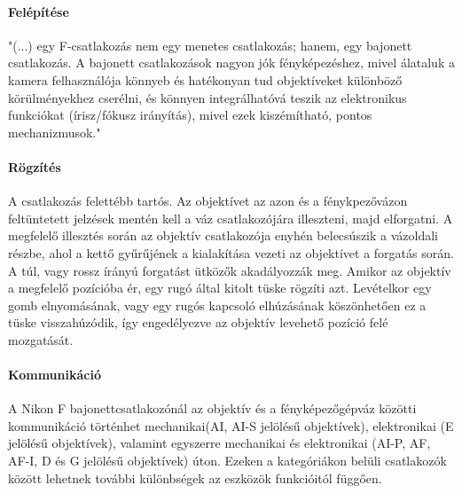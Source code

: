 \paragraph{Felépítése}

"(...) egy F-csatlakozás nem egy menetes csatlakozás; hanem, egy bajonett csatlakozás. A bajonett csatlakozások nagyon jók fényképezéshez, mivel álataluk a kamera felhasználója könnyeb és hatékonyan tud objektíveket különböző körülményekhez cserélni, és könnyen integrálhatóvá teszik az elektronikus funkciókat (írisz/fókusz irányítás), mivel ezek kiszémítható, pontos mechanizmusok."\cite{Nikon-bajonett}
\paragraph{Rögzítés}
A csatlakozás felettébb tartós\cite{Nikon_F_mount-ról}. Az objektívet az azon és a fénykpezővázon feltüntetett jelzések mentén kell a váz csatlakozójára illeszteni, majd elforgatni. A megfelelő illesztés során az objektív csatlakozója enyhén belecsúszik a vázoldali részbe, ahol a kettő gyűrűjének a kialakítása vezeti az objektívet a forgatás során. A túl, vagy rossz írányú forgatást ütközők akadályozzák meg. Amikor az objektív a megfelelő pozícióba ér, egy rugó által kitolt tüske rögzíti azt. Levételkor egy gomb elnyomásának, vagy egy rugós kapcsoló elhúzásának köszönhetően ez a tüske visszahúzódik, így engedélyezve az objektív levehető pozíció felé mozgatását.

\paragraph{Kommunikáció}
A Nikon F bajonettcsatlakozónál az objektív és a fényképezőgépváz közötti kommunikáció történhet mechanikai(AI, AI-S jelölésű objektívek)\cite{Nikon_naming_convention}, elektronikai (E jelölésű objektívek)\cite{Nikon_naming_convention}, valamint egyszerre mechanikai és elektronikai (AI-P, AF, AF-I, D és G jelölésű objektívek)%
\cite{Nikon_CPU}úton. Ezeken a kategóriákon belüli csatlakozók között lehetnek további különbségek az eszközök funkcióitól függően.

